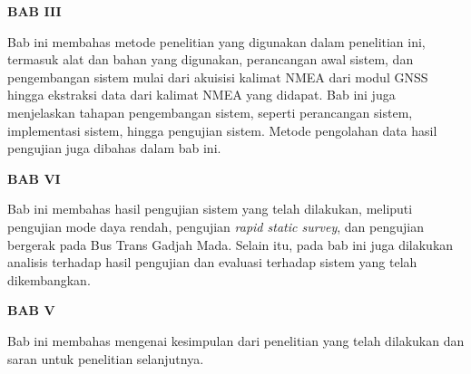 \textbf{BAB III}

Bab ini membahas metode penelitian yang digunakan dalam penelitian ini, termasuk alat dan bahan yang digunakan, perancangan awal sistem, dan pengembangan sistem mulai dari akuisisi kalimat NMEA dari modul GNSS hingga ekstraksi data dari kalimat NMEA yang didapat. Bab ini juga menjelaskan tahapan pengembangan sistem, seperti perancangan sistem, implementasi sistem, hingga pengujian sistem. Metode pengolahan data hasil pengujian juga dibahas dalam bab ini.  

\textbf{BAB VI}

Bab ini membahas hasil pengujian sistem yang telah dilakukan, meliputi pengujian mode daya rendah, pengujian \textit{rapid static survey}, dan pengujian bergerak pada Bus Trans Gadjah Mada. Selain itu, pada bab ini juga dilakukan analisis terhadap hasil pengujian dan evaluasi terhadap sistem yang telah dikembangkan.

\textbf{BAB V}

Bab ini membahas mengenai kesimpulan dari penelitian yang telah dilakukan dan saran untuk penelitian selanjutnya.